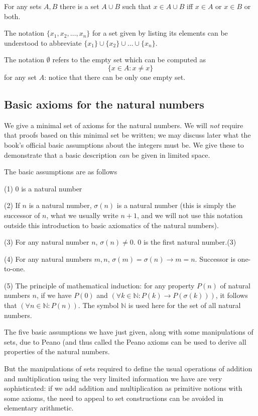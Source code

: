\documentclass[12pt]{article}
\begin{document}
For any sets $A,B$ there is a set $A \cup B$ such that $x \in A \cup B$ iff $x \in A$ or $x \in B$ or both.  

The notation $\{x_1,x_2,\ldots,x_n\}$ for a set given by listing its elements
can be understood to abbreviate $\{x_1\} \cup \{x_2\} \cup \ldots \cup \{x_n\}$.  

The notation $\emptyset$ refers to the empty set which can be computed as $$\{x \in A:x \neq x\}$$ for any set $A$:  notice that there can be only one empty set.

\subsection{Basic axioms for the natural numbers}

We give a minimal set of axioms for the natural numbers.  We will {\em not\/} require that proofs based on this minimal set be written;  we may discuss later what the book's official basic assumptions about the integers must be.  We give these to demonstrate that a basic description {\em can\/} be given in limited space.

The basic assumptions are as follows

(1) 0 is a natural number

(2) If $n$ is a natural number, $\sigma(n)$ is a natural number (this is simply the successor of $n$, what we usually write $n+1$, and we will not use this notation outside this introduction to basic axiomatics of the natural numbers).

(3) For any natural number $n$, $\sigma(n) \neq 0$.  0 is the first natural number.(3)  

(4) For any natural numbers $m,n$,  $\sigma(m)  = \sigma(n) \rightarrow m=n$.  Successor is one-to-one.

(5) The principle of mathematical induction:  for any property $P(n)$ of natural numbers $n$, if we have $P(0)$ and $(\forall k\in {\mathbb N}:P(k) \rightarrow P(\sigma(k)))$, it follows that
$(\forall n \in {\mathbb N}:P(n))$.  The symbol $\mathbb N$ is used here for the set of all natural numbers.

The five basic assumptions we have just given, along with some manipulations of sets, due to Peano (and thus called the Peano axioms can be used to derive all properties of the natural numbers.

But the manipulations of sets required to define the usual operations of addition and multiplication using the very limited information we have are very sophisticated:  if we add addition and multiplication as primitive notions with some axioms, the need to appeal to set constructions can be avoided in elementary arithmetic.
\end{document}
